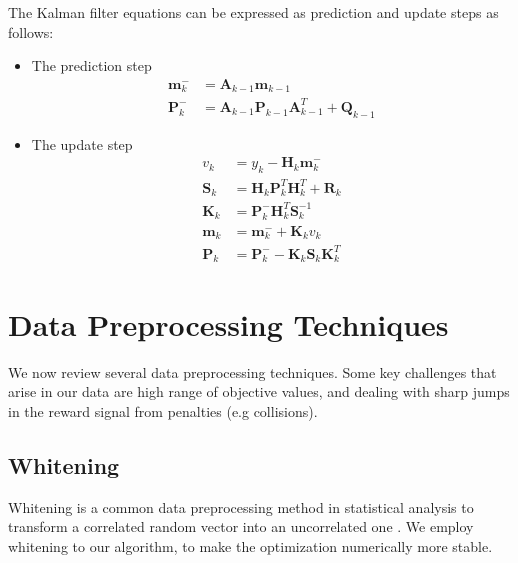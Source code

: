 The Kalman filter equations can be expressed as
prediction and update steps as follows:
\begin{itemize}
\item The prediction step
  \begin{equation}
    \label{KF_prediction}
    \begin{aligned}
      \mathbf{m}_k^- &= \mathbf{A}_{k-1} \mathbf{m}_{k-1} \\
      \mathbf{P}_k^- &= \mathbf{A}_{k-1} \mathbf{P}_{k-1} \mathbf{A}^T_{k-1}
      + \mathbf{Q}_{k-1}
    \end{aligned}
  \end{equation}

\item The update step
  \begin{equation}
    \label{KF_update}
    \begin{aligned}
      v_k &= y_k - \mathbf{H}_k \mathbf{m}_k^- \\
      \mathbf{S}_k &= \mathbf{H}_k \mathbf{P}_k^T \mathbf{H}^T_k +
      \mathbf{R}_k \\
      \mathbf{K}_k &= \mathbf{P}_k^- \mathbf{H}_k^T \mathbf{S}_k^{-1} \\
      \mathbf{m}_k &= \mathbf{m}_k^- + \mathbf{K}_k v_k \\
      \mathbf{P}_k &= \mathbf{P}_k^- - \mathbf{K}_k \mathbf{S}_k \mathbf{K}_k^T
    \end{aligned}
  \end{equation}
\end{itemize}


\section{Data Preprocessing Techniques}
\label{sec:data_pre}
We now review several data preprocessing techniques.
Some key challenges that arise
in our data  are high range of objective values,
and dealing with sharp jumps in
the reward signal from penalties (e.g collisions).

\subsection{Whitening}
\label{sec:whitening}
Whitening is a common data preprocessing method in statistical analysis
to transform a correlated random vector into an uncorrelated one
\citep{kessy2018optimal}.
We employ whitening to our algorithm, to make the optimization
numerically more stable.

